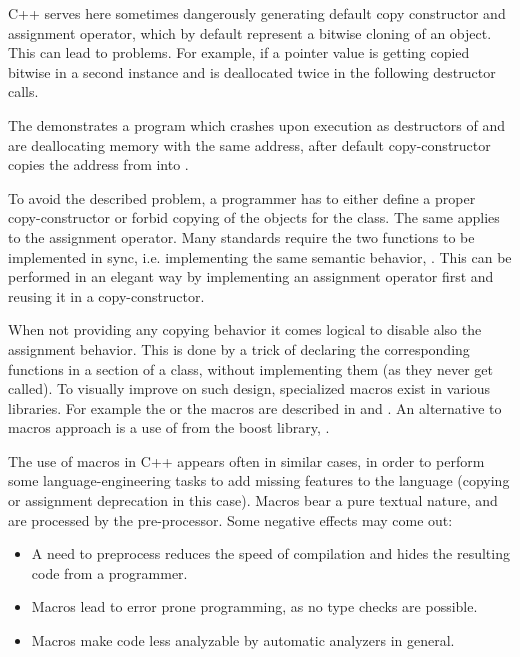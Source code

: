 C++ serves here sometimes dangerously generating default copy constructor and assignment operator, which by default represent
a bitwise cloning of an object. This can lead to problems. For example, if a pointer value is getting copied bitwise in a second
instance and is deallocated twice in the following destructor calls.


The  demonstrates a program which crashes upon execution as destructors of  and  are deallocating 
memory with the same address, after default copy-constructor copies the address from  into .

To avoid the described problem, a programmer has to either define a proper copy-constructor or forbid copying of the objects for
the class. The same applies to the assignment operator. Many standards require the two functions to be implemented in sync, i.e. 
implementing the same semantic behavior, \cite{ooocpp}. This can be performed in an elegant way by implementing an assignment 
operator first and reusing it in  a copy-constructor.

When not providing any copying behavior it comes logical to disable also the assignment behavior. 
This is done by a trick of declaring the corresponding functions in a  section of a class, without implementing them
(as they never get called). To visually improve on such design, specialized macros exist in 
various libraries. For example the  or the  macros are described in 
\cite{googlecppstyle} and \cite{qobjref}. An alternative to macros approach is a use of  from the 
boost library, \cite{boost}.

The use of macros in C++ appears often in similar cases, in order to perform some language-engineering tasks to add missing
features to the language (copying or assignment deprecation in this case). Macros bear a pure textual nature, and are processed by the pre-processor. Some negative effects may 
come out:
\begin{itemize}
 
 \item A need to preprocess reduces the speed of compilation and hides the resulting code from a programmer.
 \item Macros lead to error prone programming, as no type checks are possible.
 \item Macros make code less analyzable by automatic analyzers in general.

\end{itemize}

